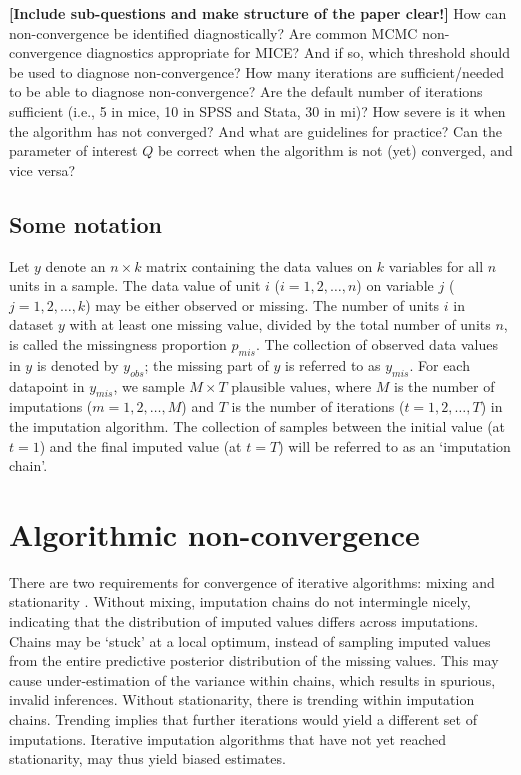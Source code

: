\documentclass[Royal,times,sageh]{sagej}
\begin{document}
\textbf{{[}Include sub-questions and make structure of the paper clear!{]}} How can non-convergence be identified diagnostically? Are common MCMC non-convergence diagnostics appropriate for MICE? And if so, which threshold should be used to diagnose non-convergence? How many iterations are sufficient/needed to be able to diagnose non-convergence? Are the default number of iterations sufficient (i.e., 5 in mice, 10 in SPSS and Stata, 30 in mi)? How severe is it when the algorithm has not converged? And what are guidelines for practice? Can the parameter of interest \(Q\) be correct when the algorithm is not (yet) converged, and vice versa?

\hypertarget{some-notation}{%
\subsection{Some notation}\label{some-notation}}

Let \(y\) denote an \(n \times k\) matrix containing the data values on \(k\) variables for all \(n\) units in a sample. The data value of unit \(i\) (\(i = 1, 2, \dots, n\)) on variable \(j\) (\(j = 1, 2, \dots, k\)) may be either observed or missing. The number of units \(i\) in dataset \(y\) with at least one missing value, divided by the total number of units \(n\), is called the missingness proportion \(p_{mis}\). The collection of observed data values in \(y\) is denoted by \(y_{obs}\); the missing part of \(y\) is referred to as \(y_{mis}\). For each datapoint in \(y_{mis}\), we sample \(M \times T\) plausible values, where \(M\) is the number of imputations (\(m = 1, 2, \dots, M\)) and \(T\) is the number of iterations (\(t = 1, 2, \dots, T\)) in the imputation algorithm. The collection of samples between the initial value (at \(t=1\)) and the final imputed value (at \(t=T\)) will be referred to as an `imputation chain'.

\hypertarget{algorithmic-non-convergence}{%
\section{Algorithmic non-convergence}\label{algorithmic-non-convergence}}

There are two requirements for convergence of iterative algorithms: mixing and stationarity \citep{gelm13}. Without mixing, imputation chains do not intermingle nicely, indicating that the distribution of imputed values differs across imputations. Chains may be `stuck' at a local optimum, instead of sampling imputed values from the entire predictive posterior distribution of the missing values. This may cause under-estimation of the variance within chains, which results in spurious, invalid inferences. Without stationarity, there is trending within imputation chains. Trending implies that further iterations would yield a different set of imputations. Iterative imputation algorithms that have not yet reached stationarity, may thus yield biased estimates.
\end{document}
